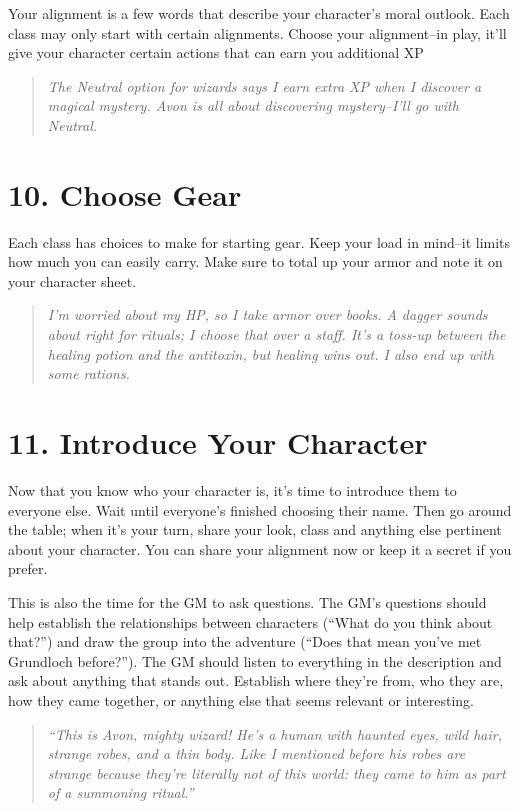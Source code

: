 Your alignment is a few words that describe your character's moral outlook. Each class may only start with certain alignments. Choose your alignment--in play, it'll give your character certain actions that can earn you additional XP

\begin{quote}
\emph{The Neutral option for wizards says I earn extra XP when I discover a magical mystery. Avon is all about discovering mystery--I'll go with Neutral.}
\end{quote}
\section*{10. Choose Gear}

Each class has choices to make for starting gear. Keep your load in mind--it limits how much you can easily carry. Make sure to total up your armor and note it on your character sheet.

\begin{quote}
\emph{I'm worried about my HP, so I take armor over books. A dagger sounds about right for rituals; I choose that over a staff. It's a toss-up between the healing potion and the antitoxin, but healing wins out. I also end up with some rations.}
\end{quote}
\section*{11. Introduce Your Character}

Now that you know who your character is, it's time to introduce them to everyone else. Wait until everyone's finished choosing their name. Then go around the table; when it's your turn, share your look, class and anything else pertinent about your character. You can share your alignment now or keep it a secret if you prefer.

This is also the time for the GM to ask questions. The GM's questions should help establish the relationships between characters (``What do you think about that?'') and draw the group into the adventure (``Does that mean you've met Grundloch before?''). The GM should listen to everything in the description and ask about anything that stands out. Establish where they're from, who they are, how they came together, or anything else that seems relevant or interesting.

\begin{quote}
\emph{``This is Avon, mighty wizard! He's a human with haunted eyes, wild hair, strange robes, and a thin body. Like I mentioned before his robes are strange because they're literally not of this world: they came to him as part of a summoning ritual.''}
\end{quote}
